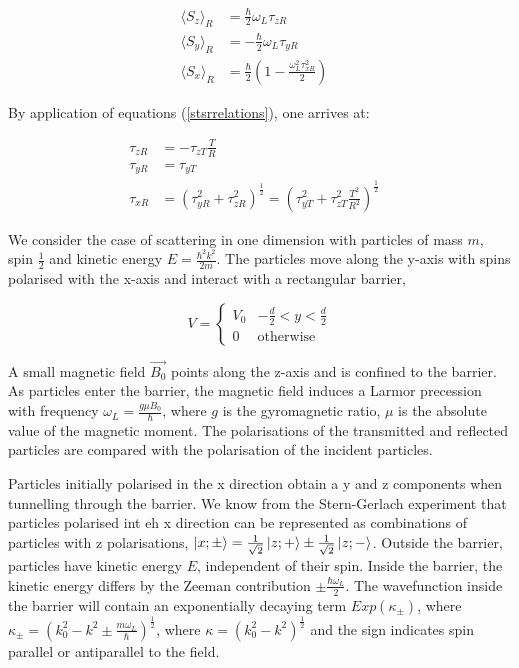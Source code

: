 \documentclass{article}
\begin{document}
\begin{subequations}
\begin{flalign}
	\langle S_z \rangle_R &= \frac{\hbar}{2}\omega_L\tau_{zR}& \\
	\langle S_y \rangle_R &= -\frac{\hbar}{2}\omega_L\tau_{yR} \\
	\langle S_x \rangle_R &= \frac{\hbar}{2}\left(1-\frac{\omega_L^2\tau_{xR}^2}{2}\right)
\end{flalign}
\end{subequations}

\noindent By application of equations (\ref{stsrrelations}), one arrives at:

\begin{subequations}
\begin{flalign}
	\tau_{zR}&=-\tau_{zT} \frac{T}{R}&\\
	\tau_{yR}&=\tau_{yT}\\
\tau_{xR}&=(\tau_{yR}^2+\tau_{zR}^2)^{\frac{1}{2}}=\left(\tau_{yT}^2+\tau_{zT}^2 \frac{T^2}{R^2}\right)^{\frac{1}{2}}
\end{flalign}
\end{subequations}



We consider the case of scattering in one dimension with particles of mass $m$, spin $\frac{1}{2}$ and kinetic energy $
E = \frac{\hbar^2k^2}{2m}$. The particles move along the y-axis with spins polarised with the x-axis and interact with a rectangular barrier,

\begin{equation}
	V = 
	\begin{cases}
	V_0 & -\frac{d}{2}<y<\frac{d}{2}\\
		0 & \text{otherwise}
	\end{cases}
\end{equation}

A small magnetic field $\vec{B_{0}}$ points along the z-axis and is confined to the barrier. As particles enter the barrier, the magnetic field induces a Larmor precession with frequency $\omega_{L}=\frac{g \mu B_{0}}{\hbar}$, where $g$ is the gyromagnetic ratio, $\mu$ is the absolute value of the magnetic moment. The polarisations of the transmitted and reflected particles are compared with the polarisation of the incident particles.

Particles initially polarised in the x direction obtain a y and z components when tunnelling through the barrier. We know from the Stern-Gerlach experiment that particles polarised int eh x direction can be represented as combinations of particles with z polarisations, $\ket{x; \pm} = \frac{1}{\sqrt{2}}\ket{z;+} \pm \frac{1}{\sqrt{2}}\ket{z;-}$. Outside the barrier, particles have kinetic energy $E$, independent of their spin. Inside the barrier, the kinetic energy differs by the Zeeman contribution $\pm \frac{\hbar \omega_{L}}{2}$. The wavefunction inside the barrier will contain an exponentially decaying term $Exp(\kappa_{\pm})$, where $\kappa_{\pm} = (k^{2}_{0}-k^{2} \pm \frac{m \omega_L}{\hbar})^{\frac{1}{2}}$, where $\kappa = (k_{0}^2-k^2)^{\frac{1}{2}}$ and the sign indicates spin parallel or antiparallel to the field.  
\end{document}

